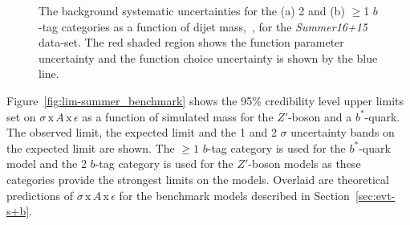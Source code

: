 \begin{figure}[!ht]
  \begin{center}
    \captionsetup[subfigure]{aboveskip=0pt,justification=centering}
  \end{center}
  \vspace{-1mm}
  \caption{The background systematic uncertainties for the (a) 2 and (b) $\geq$1 $b$-tag categories
    as a function of dijet mass,~\mjj, for the \textit{Summer16+15} data-set.
    The red shaded region shows the function parameter uncertainty and the
    function choice uncertainty is shown by the blue line. }
  \label{fig:lim-summer_systBkg}
\end{figure}

Figure~\ref{fig:lim-summer_benchmark} shows the
95\% credibility level upper limits set on $\sigma\,\text{x}\,\mathit{A}\,\text{x}\,\epsilon$
as a function of simulated mass
for the $Z'$-boson and a $b^*$-quark.
The observed limit, the expected limit and the 1 and 2 $\sigma$ uncertainty bands on the expected limit are shown.
The $\geq1$ $b$-tag category is used for the $b^*$-quark model
and the 2 $b$-tag category is used for the $Z'$-boson models
as these categories provide the strongest limits on the models.
Overlaid are theoretical predictions of
$\sigma\,\text{x}\,\mathit{A}\,\text{x}\,\epsilon$ for the benchmark models described in Section~\ref{sec:evt-s+b}.

